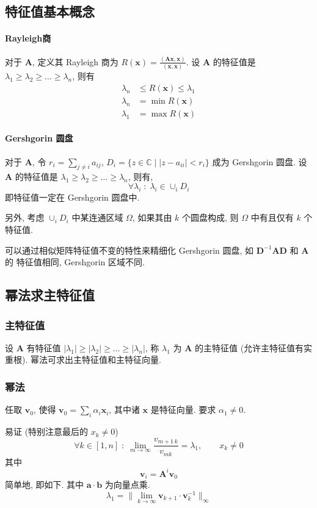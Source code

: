 \documentclass{ctexart}
\newcommand{\Cset}{\mathbb{C}}
\begin{document}
\subsection{特征值基本概念}
\paragraph{Rayleigh商}
    对于 $\mathbf{A}$, 定义其 Rayleigh 商为
    $R(\mathbf{x}) = \frac{(\mathbf{A} \mathbf{x} , \mathbf{x} )}{(\mathbf{x} ,\mathbf{x} )}$.
    设 $\mathbf{A}$ 的特征值是 $\lambda_1 \ge \lambda_2 \ge \ldots \ge \lambda_n$,
    则有 \begin{align*}
        \lambda_n &\le R(\mathbf{x} ) \le \lambda_1 \\
        \lambda_n &= \min R(\mathbf{x})\\
        \lambda_1 &= \max R(\mathbf{x})
    \end{align*}
\paragraph{Gershgorin 圆盘}
    对于 $\mathbf{A}$, 令 $r_i = \sum_{j \neq i} a_{ij}$,
    $D_i = \{z \in \Cset \;|\; |z - a_{ii}| < r_i\}$ 成为 Gershgorin 圆盘.
    设 $\mathbf{A}$ 的特征值是 $\lambda_1 \ge \lambda_2 \ge \ldots \ge \lambda_n$,
    则有, \[\forall \lambda_i\;:\; \lambda_i \in \cup_i D_i\]
    即特征值一定在 Gershgorin 圆盘中.\par
    另外, 考虑 $\cup_i D_i$ 中某连通区域 $\Omega$, 如果其由 $k$ 个圆盘构成,
    则 $\Omega$ 中有且仅有 $k$ 个特征值.\par
    可以通过相似矩阵特征值不变的特性来精细化 Gershgorin 圆盘,
    如 $ \mathbf{D}^{-1} \mathbf{A} \mathbf{D} $ 和 $\mathbf{A} $ 的 特征值相同,
    Gershgorin 区域不同.

\subsection{幂法求主特征值}
\subsubsection{主特征值}
    设 $\mathbf{A}$ 有特征值 $|\lambda_1| \ge |\lambda_2| \ge \ldots \ge |\lambda_n|$,
    称 $\lambda_1$ 为 $\mathbf{A}$ 的主特征值 (允许主特征值有实重根). 幂法可求出主特征值和主特征向量.
\subsubsection{幂法}
    任取 $\mathbf{v}_0$, 使得 $\mathbf{v}_0 = \sum_i \alpha_i \mathbf{x}_i$, 其中诸 $\mathbf{x}$ 是特征向量.
    要求 $\alpha_1 \neq 0$.\par
    易证 (特别注意最后的 $x_k \neq 0$) \[
        \forall k \in [1,n]\;:\; \lim_{m\to\infty} \frac{v_{m+1\,k}}{v_{mk}} = \lambda_1,\qquad x_k \neq 0\]
    其中 \[ \mathbf{v}_i = \mathbf{A}^i \mathbf{v}_0 \]
    简单地, 即如下. 其中 $\mathbf{a} \cdot \mathbf{b} $ 为向量点乘. \[
        \lambda_1 = \| \lim_{k \to \infty} \mathbf{v}_{k+1} \cdot \mathbf{v}_{k}^{-1} \|_{\infty}\]
\end{document}
